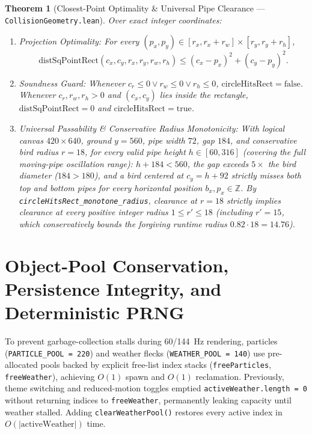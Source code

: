 \documentclass[11pt,letterpaper]{article}
\newtheorem{theorem}{Theorem}
\theoremstyle{remark}
\begin{document}
\begin{theorem}[Closest-Point Optimality \& Universal Pipe Clearance --- \texttt{CollisionGeometry.lean}]
\label{thm:collision}
Over exact integer coordinates:
\begin{enumerate}[leftmargin=1.8em, itemsep=1pt]
  \item \emph{Projection Optimality:} For every $(p_x, p_y) \in [r_x, r_x+r_w] \times [r_y, r_y+r_h]$,
  \[\mathrm{distSqPointRect}(c_x, c_y, r_x, r_y, r_w, r_h) \le (c_x - p_x)^2 + (c_y - p_y)^2.\]
  \item \emph{Soundness Guard:} Whenever $c_r \le 0 \vee r_w \le 0 \vee r_h \le 0$, $\mathrm{circleHitsRect} = \mathrm{false}$. Whenever $c_r, r_w, r_h > 0$ and $(c_x, c_y)$ lies inside the rectangle, $\mathrm{distSqPointRect} = 0$ and $\mathrm{circleHitsRect} = \mathrm{true}$.
  \item \emph{Universal Passability \& Conservative Radius Monotonicity:} With logical canvas $420 \times 640$, ground $y = 560$, pipe width $72$, gap $184$, and conservative bird radius $r = 18$, for every valid pipe height $h \in [60, 316]$ (covering the full moving-pipe oscillation range): $h + 184 < 560$, the gap exceeds $5\times$ the bird diameter ($184 > 180$), and a bird centered at $c_y = h + 92$ strictly misses both top and bottom pipes for every horizontal position $b_x, p_x \in \mathbb{Z}$. By \texttt{circleHitsRect\_\allowbreak monotone\_\allowbreak radius}, clearance at $r=18$ strictly implies clearance at every positive integer radius $1 \le r' \le 18$ (including $r'=15$, which conservatively bounds the forgiving runtime radius $0.82 \cdot 18 = 14.76$).
\end{enumerate}
\end{theorem}

\section{Object-Pool Conservation, Persistence Integrity, and Deterministic PRNG}
\label{sec:pools}

To prevent garbage-collection stalls during 60/144~Hz rendering, particles (\texttt{PARTICLE\_POOL = 220}) and weather flecks (\texttt{WEATHER\_POOL = 140}) use pre-allocated pools backed by explicit free-list index stacks (\texttt{freeParticles}, \texttt{freeWeather}), achieving $O(1)$ spawn and $O(1)$ reclamation. Previously, theme switching and reduced-motion toggles emptied \texttt{activeWeather.length = 0} without returning indices to \texttt{freeWeather}, permanently leaking capacity until weather stalled. Adding \texttt{clearWeatherPool()} restores every active index in $O(|\mathrm{activeWeather}|)$ time.
\end{document}
